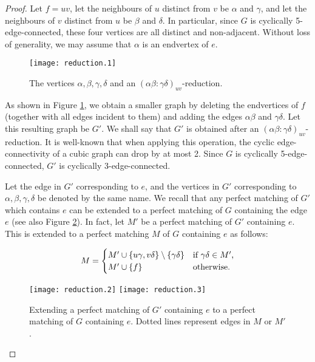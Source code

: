 \documentclass[]{theclass}
\begin{document}
\begin{proof}
Let $f=uv$, let the neighbours of $u$ distinct from $v$ be $\alpha$ and $\gamma$, and let the neighbours of $v$ distinct from $u$ be $\beta$ and $\delta$. 
In particular, since $G$ is cyclically 5-edge-connected, these four vertices are all distinct and non-adjacent. Without loss of generality, we may assume that $\alpha$ is an endvertex of $e$.

\begin{figure}[ht]
      \centering
      \texttt{[image: reduction.1]}
      \caption{The vertices $\alpha,\beta, \gamma, \delta$ and an $(\alpha\beta:\gamma\delta)_{uv}$-reduction.}
      \label{figure reduction1}
\end{figure}

As shown in Figure \ref{figure reduction1}, we obtain a smaller graph by deleting the endvertices of $f$ (together with all edges incident to them) and adding the edges $\alpha\beta$ and $\gamma\delta$. Let this resulting graph be $G'$. We shall say that $G'$ is obtained after an $(\alpha\beta:\gamma\delta)_{uv}$-reduction. It is well-known that when applying this operation, the cyclic edge-connectivity of a cubic graph can drop by at most 2. Since $G$ is cyclically 5-edge-connected, $G'$ is cyclically 3-edge-connected. 

Let the edge in $G'$ corresponding to $e$, and the vertices in $G'$ corresponding to $\alpha,\beta, \gamma, \delta$ be denoted by the same name. We recall that any perfect matching of $G'$ which contains $e$ can be extended to a perfect matching of $G$ containing the edge $e$ (see also Figure \ref{figure reduction11}). In fact, let $M'$ be a perfect matching of $G'$ containing $e$. This is extended to a perfect matching $M$ of $G$ containing $e$ as follows:

\[M =
  \begin{cases}
  M'\cup\{u\gamma, v\delta\}\setminus \{\gamma\delta\}  & $if $\gamma\delta\in M'$,$ \\
  M'\cup \{f\} & $otherwise.$ 
  \end{cases}\]

\begin{figure}[ht]
      \centerline{\hfill
      \texttt{[image: reduction.2]}
      \hfill\hfill
      \texttt{[image: reduction.3]}
      \hfill}
      \caption{Extending a perfect matching of $G'$ containing $e$ to a perfect matching of $G$ containing $e$. Dotted lines represent edges in $M$ or $M'$.} \label{figure reduction11}
\end{figure}


\end{proof}
\end{document}

